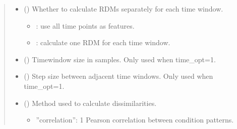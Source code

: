 \documentclass[letterpaper,10pt,english]{sphinxhowto}
\begin{document}
\begin{fulllineitems}
\begin{quote}
\begin{description}
\begin{itemize}
\begin{itemize}
\item {} 
: calculate one RDM for each channel.

\end{itemize}


\item {} 
\sphinxAtStartPar
{} (\sphinxstyleliteralemphasis{\sphinxupquote{, }}\sphinxstyleliteralemphasis{\sphinxupquote{, }}) \textendash{} 
\sphinxAtStartPar
Whether to calculate RDMs separately for each time window.
\begin{itemize}
\item {} 
: use all time points as features.

\item {} 
: calculate one RDM for each time window.

\end{itemize}


\item {} 
\sphinxAtStartPar
{} (\sphinxstyleliteralemphasis{\sphinxupquote{, }}) \textendash{} Time\sphinxhyphen{}window size in samples. Only used when time\_opt=1.

\item {} 
\sphinxAtStartPar
{} (\sphinxstyleliteralemphasis{\sphinxupquote{, }}) \textendash{} Step size between adjacent time windows. Only used when time\_opt=1.

\item {} 
\sphinxAtStartPar
{} (\sphinxstyleliteralemphasis{\sphinxupquote{, }}\sphinxstyleliteralemphasis{\sphinxupquote{, }}) \textendash{} 
\sphinxAtStartPar
Method used to calculate dissimilarities.
\begin{itemize}
\item {} 
\sphinxAtStartPar
”correlation”: 1 \sphinxhyphen{} Pearson correlation between condition patterns.


\end{itemize}
\end{itemize}
\end{description}
\end{quote}
\end{fulllineitems}
\end{document}
